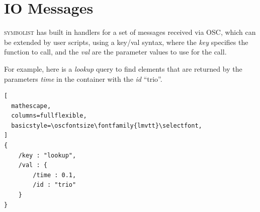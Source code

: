 \documentclass{article}
\def\symbolist{\textsc{symbolist}\xspace}
\def\oscfontsize{\footnotesize}
\begin{document}
\section{IO Messages}\label{subsec:io_messages}

\symbolist has built in handlers for a set of messages received via OSC, which can be extended by user scripts, using a key/val syntax, where the \textit{key} specifies the function to call, and the \textit{val} are the parameter values to use for the call.

For example, here is a \textit{lookup} query to find elements that are returned by the parameters \textit{time} in the container with the \textit{id} ``trio''.


\begin{lstlisting}[
  mathescape,
  columns=fullflexible,
  basicstyle=\oscfontsize\fontfamily{lmvtt}\selectfont,
]
{
    /key : "lookup",
    /val : {
        /time : 0.1,
        /id : "trio"
    }
}

\end{lstlisting}
\end{document}
